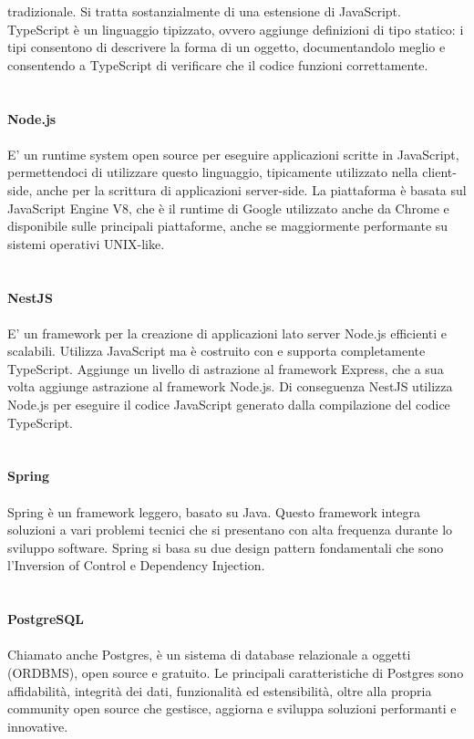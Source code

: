 tradizionale. Si tratta sostanzialmente di una estensione di JavaScript.
TypeScript è un linguaggio tipizzato, ovvero aggiunge definizioni di tipo statico: i tipi consentono di 
descrivere la forma di un oggetto, documentandolo meglio e consentendo a TypeScript di verificare che 
il codice funzioni correttamente.
\\\\\\
\textbf{Node.js}
\\\\
E' un runtime system open source per eseguire applicazioni scritte in JavaScript, permettendoci di utilizzare questo 
linguaggio, tipicamente utilizzato nella client-side, anche per la scrittura di applicazioni server-side.
La piattaforma è basata sul JavaScript Engine V8, che è il runtime di Google utilizzato anche da Chrome e 
disponibile sulle principali piattaforme, anche se maggiormente performante su sistemi operativi UNIX-like.
\\\\\\
\textbf{NestJS}
\\\\
E' un framework per la creazione di applicazioni lato server Node.js efficienti e scalabili. 
Utilizza JavaScript ma è costruito con e supporta completamente TypeScript. Aggiunge un livello di astrazione
al framework Express, che a sua volta aggiunge astrazione al framework Node.js. Di conseguenza NestJS 
utilizza Node.js per eseguire il codice JavaScript generato dalla compilazione del codice TypeScript.
\\\\\\
\textbf{Spring}
\\\\
Spring è un framework leggero, basato su Java. Questo framework integra soluzioni a vari problemi tecnici
che si presentano con alta frequenza durante lo sviluppo software. Spring si basa su due design pattern
fondamentali che sono l'Inversion of Control e Dependency Injection.
\\\\\\
\textbf{PostgreSQL}
\\\\
Chiamato anche Postgres, è un sistema di database relazionale a oggetti (ORDBMS), open source e 
gratuito.
Le principali caratteristiche di Postgres sono affidabilità, integrità dei dati, funzionalità ed estensibilità, 
oltre alla propria community open source che gestisce, aggiorna e sviluppa soluzioni performanti e innovative.
